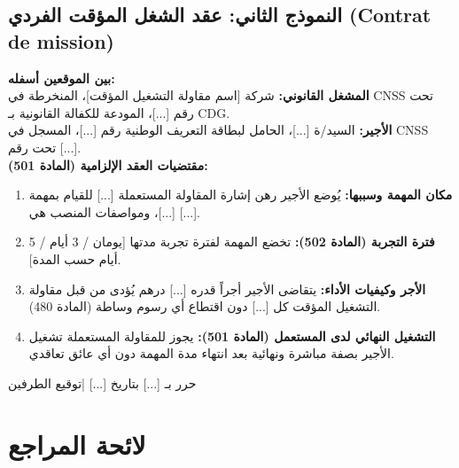 \section*{النموذج الثاني: عقد الشغل المؤقت الفردي (\texorpdfstring{\textenglish{Contrat de mission}}{Contrat de mission})}
\begin{tcolorbox}[colback=white, colframe=maincolor, arc=4pt, title={\textbf{عقد شغل مؤقت (عقد مهمة)}}]
\small
\textbf{بين الموقعين أسفله:}\\
\textbf{المشغل القانوني:} شركة [اسم مقاولة التشغيل المؤقت]، المنخرطة في \textenglish{CNSS} تحت رقم [...]، المودعة للكفالة القانونية بـ \textenglish{CDG}.\\
\textbf{الأجير:} السيد/ة [...]، الحامل لبطاقة التعريف الوطنية رقم [...]، المسجل في \textenglish{CNSS} تحت رقم [...].
\vspace{0.15cm}\\
\textbf{مقتضيات العقد الإلزامية (المادة 501):}
\begin{enumerate}[itemsep=3pt]
    \item \textbf{مكان المهمة وسببها:} يُوضع الأجير رهن إشارة المقاولة المستعملة [...] للقيام بمهمة [...]، ومواصفات المنصب هي [...].
    \item \textbf{فترة التجربة (المادة 502):} تخضع المهمة لفترة تجربة مدتها [يومان / \textenglish{3} أيام / \textenglish{5} أيام حسب المدة].
    \item \textbf{الأجر وكيفيات الأداء:} يتقاضى الأجير أجراً قدره [...] درهم يُؤدى من قبل مقاولة التشغيل المؤقت كل [...] دون اقتطاع أي رسوم وساطة (المادة \textenglish{480}).
    \item \textbf{التشغيل النهائي لدى المستعمل (المادة 501):} يجوز للمقاولة المستعملة تشغيل الأجير بصفة مباشرة ونهائية بعد انتهاء مدة المهمة دون أي عائق تعاقدي.
\end{enumerate}
حرر بـ [...] بتاريخ [...] \quad|\quad توقيع الطرفين
\end{tcolorbox}

\chapter*{لائحة المراجع}

